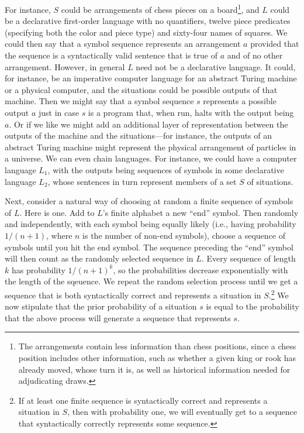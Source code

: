 For instance, $S$ could be arrangements of chess pieces on a board\footnote{The arrangements contain less information
than chess positions, since a chess position includes other information, such as whether a given king or rook has already
moved, whose turn it is, as well as historical information needed for adjudicating draws.}, and $L$ could be a declarative 
first-order language with no quantifiers, twelve piece predicates (specifying both the color and piece type) and sixty-four names of squares.
We could then say that a symbol sequence represents an arrangement $a$ provided that the sequence is a 
syntactically valid sentence that is true of $a$ and of no other arrangement. However, in general $L$ need not be a declarative
language. It could, for instance, be an imperative computer language for an abstract Turing machine or a physical computer,
and the situations could be possible outputs of that machine. Then we might say that a symbol sequence $s$ represents
a possible output $a$ just in case $s$ is a program that, when run, halts with the output being $a$. Or if we like we might 
add an additional layer of representation between the outputs of the machine and the situations---for instance, the outputs
of an abstract Turing machine might represent the physical arrangement of particles in a universe.  
We can even chain languages. For instance, we could have a computer language $L_1$, with the outputs being sequences of
symbols in some declarative language $L_2$, whose sentences in turn represent members of a set $S$ of situations.

Next, consider a natural way of choosing at random a finite sequence of symbols of $L$. Here is one. Add to $L$'s finite alphabet 
a new ``end'' symbol. Then randomly and independently, with each symbol being equally likely (i.e., having probability
$1/(n+1)$, where $n$ is the number of non-end symbols), choose a sequence of
symbols until you hit the end symbol. The sequence preceding the ``end'' symbol will then count as the randomly
selected sequence in $L$. Every sequence of length $k$ has probability $1/(n+1)^k$, so the probabilities decrease 
exponentially with the length of the sqeuence. We repeat the random selection process until we get a sequence that is both syntactically correct
and represents a situation in $S$.\footnote{If at least one finite sequence is syntactically correct and represents a 
situation in $S$, then with probability one, we will eventually get to a sequence that syntactically correctly represents some 
sequence.}  We now stipulate that the prior probability of a situation $s$ is equal to the probability that the
above process will generate a sequence that represents $s$.

